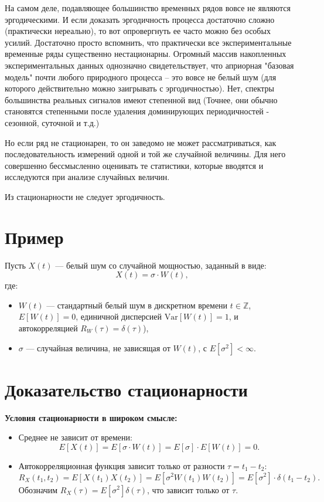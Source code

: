 На самом деле, подавляющее большинство временных рядов вовсе
не являются эргодическими. И если доказать эргодичность процесса
достаточно сложно (практически нереально), то вот
опровергнуть ее часто можно без особых усилий. Достаточно просто
вспомнить, что практически все экспериментальные временные ряды
существенно нестационарны. Огромный массив накопленных
экспериментальных данных однозначно свидетельствует, что априорная
"базовая модель" почти любого природного процесса – это вовсе не
белый шум (для которого действительно можно заигрывать с
эргодичностью). Нет, спектры большинства реальных сигналов имеют
степенной вид (Точнее, они обычно становятся степенными после
удаления доминирующих периодичностей - сезонной, суточной и т.д.)

Но если ряд не стационарен, то он заведомо не может
рассматриваться, как последовательность измерений одной и той же
случайной величины. Для него совершенно бессмысленно оценивать те
статистики, которые вводятся и исследуются при анализе случайных величин.

Из стационарности не следует эргодичность.

\section*{Пример}

Пусть \( X(t) \) — белый шум со случайной мощностью, заданный в виде:
\[
X(t) = \sigma \cdot W(t),
\]
где:
\begin{itemize}
\item \( W(t) \) — стандартный белый шум в дискретном времени \(t
\in \mathbb{Z}\), \(
E[W(t)] = 0 \), единичной дисперсией \( \text{Var}[W(t)] = 1 \),
и автокорреляцией \( R_W(\tau) = \delta(\tau) \)),
\item \( \sigma \) — случайная величина, не зависящая от \( W(t)
\), с \( E[\sigma^2] < \infty \).
\end{itemize}

\section*{Доказательство стационарности}
\textbf{Условия стационарности в широком смысле:}
\begin{itemize}
\item Среднее не зависит от времени:
\[
E[X(t)] = E[\sigma \cdot W(t)] = E[\sigma] \cdot E[W(t)] = 0.
\]

\item Автокорреляционная функция зависит только от разности \( \tau
= t_1 - t_2 \):
\[
R_X(t_1, t_2) = E[X(t_1)X(t_2)] = E[\sigma^2 W(t_1) W(t_2)] =
E[\sigma^2] \cdot \delta(t_1 - t_2).
\]
Обозначим \( R_X(\tau) = E[\sigma^2] \delta(\tau) \), что зависит
только от \( \tau \).
\end{itemize}

